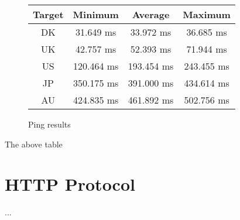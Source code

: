 \documentclass[prodmode,acmtoit]{acmsmall}
\begin{document}
\begin{figure}[H]
    \center
    \begin{tabular}{|c|c|c|c|}
        \hline
        {\bf Target} & {\bf Minimum} & {\bf Average} & {\bf Maximum} \\ \hline
        DK & 31.649 ms & 33.972 ms & 36.685 ms \\ \hline
        UK & 42.757 ms & 52.393 ms & 71.944 ms \\ \hline
        US & 120.464 ms & 193.454 ms & 243.455 ms \\ \hline
        JP & 350.175 ms & 391.000 ms & 434.614 ms \\ \hline
        AU & 424.835 ms & 461.892 ms & 502.756 ms \\ \hline
    \end{tabular}
    \caption{Ping results}
    \label{table:ping}
\end{figure}

The above table

\section{HTTP Protocol}
\label{sec:http-protocol}
...

%

%




\begin{bottomstuff}
\end{bottomstuff}
\end{document}
